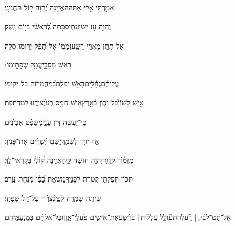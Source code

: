 \documentclass[12pt]{article}
\newcommand{\loc}[1]{\textsuperscript{\locf{#1}}}
\begin{document}
{\loc{ ז}~}‏אָמַ֣רְתִּי  אֵ֣לִי אָ֑תָּה{\hfill}הַאֲזִ֥ינָה יְ֝הֹוָ֗ה ק֣וֹל תַּחֲנוּנָֽי׃\par

{\loc{ ח}~}‏יֱהֹוִ֣ה  עֹ֣ז יְשׁוּעָתִ֑י{\hfill}סַכֹּ֥תָה לְ֝רֹאשִׁ֗י בְּי֣וֹם נָֽשֶׁק׃\par

{\loc{ ט}~}‏אַל־תִּתֵּ֣ן  מַאֲוַיֵּ֣י רָשָׁ֑ע{\hfill}זְמָמ֥וֹ אַל־תָּ֝פֵ֗ק יָר֥וּמוּ סֶֽלָה׃\par

{\loc{ י}~}‏רֹ֥אשׁ מְסִבָּ֑י{\hfill}עֲמַ֖ל שְׂפָתֵ֣ימוֹ ׃\par

{\loc{ יא}~}‏ עֲלֵיהֶ֗ם{\hfill}גֶּחָ֫לִ֥ים\newline\hspace*{.5em}בָּאֵ֥שׁ יַפִּלֵ֑ם{\hfill}בְּ֝מַהֲמֹר֗וֹת בַּל־יָקֽוּמוּ׃\par

{\loc{ יב}~}‏אִ֥ישׁ לָשׁוֹן֮{\hfill}בַּל־יִכּ֢וֹן בָּ֫אָ֥רֶץ\newline\hspace*{.5em}אִישׁ־חָמָ֥ס רָ֑ע{\hfill}יְ֝צוּדֶ֗נּוּ לְמַדְחֵפֹֽת׃\par

{\loc{ יג}~}‏ כִּֽי־יַעֲשֶׂ֣ה  דִּ֣ין עָנִ֑י{\hfill}מִ֝שְׁפַּ֗ט אֶבְיֹנִֽים׃\par

{\loc{ יד}~}‏אַ֣ךְ  יוֹד֣וּ לִשְׁמֶ֑ךָ{\hfill}יֵשְׁב֥וּ יְ֝שָׁרִ֗ים אֶת־פָּנֶֽיךָ׃\par\pend
\ledpb
\pstart[\subsection*{\textcolor{red}{פרק קמא}}]\label{פרק קמא}
{\loc{ א}~}‏מִזְמ֗וֹר לְדָ֫וִ֥ד\newline\hspace*{.5em}יְהֹוָ֣ה  ח֣וּשָׁה לִּ֑י{\hfill}הַאֲזִ֥ינָה ק֝וֹלִ֗י בְּקׇרְאִי־לָֽךְ׃\par

{\loc{ ב}~}‏תִּכּ֤וֹן תְּפִלָּתִ֣י קְטֹ֣רֶת לְפָנֶ֑יךָ{\hfill}מַֽשְׂאַ֥ת כַּ֝פַּ֗י מִנְחַת־עָֽרֶב׃\par

{\loc{ ג}~}‏שִׁיתָ֣ה  שׇׁמְרָ֣ה לְפִ֑י{\hfill}נִ֝צְּרָ֗ה עַל־דַּ֥ל שְׂפָתָֽי׃\par

{\loc{ ד}~}‏אַל־תַּט־לִבִּ֨י ֪ | רָ֡ע{\hfill}לְהִתְע֘וֹלֵ֤ל עֲלִל֨וֹת |  בְּרֶ֗שַׁע\newline\hspace*{.5em}אֶת־אִישִׁ֥ים פֹּעֲלֵי־אָ֑וֶן{\hfill}וּבַל־אֶ֝לְחַ֗ם בְּמַנְעַמֵּיהֶֽם׃\par
\end{document}
